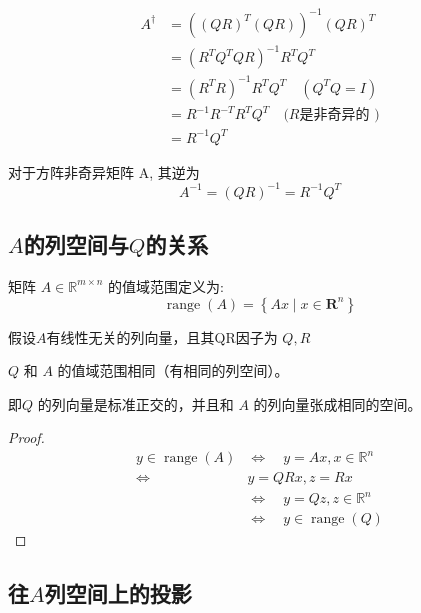 \begin{theorem}
    $$
\begin{aligned}
A^{\dagger}&=\left((Q R)^{T}(Q R)\right)^{-1}(Q R)^{T} \\
&=\left(R^{T} Q^{T} Q R\right)^{-1} R^{T} Q^{T} \\
&=\left(R^{T} R\right)^{-1} R^{T} Q^{T} \quad\left(Q^{T} Q=I\right) \\
&=R^{-1} R^{-T} R^{T} Q^{T} \quad(R{\text {是非奇异的 })} \\
 &={R^{-1} Q^{T}}
\end{aligned}
$$
\end{theorem}

\begin{corollary}
    对于方阵非奇异矩阵 $\mathrm{A}$, 其逆为
$$
A^{-1}=(Q R)^{-1}=R^{-1} Q^{T}
$$
\end{corollary}

\subsection{$A$的列空间与$Q$的关系}

矩阵 $A \in \mathbb{R}^{m \times n}$ 的值域范围定义为:
$$
\operatorname{range}(A)=\left\{A x \mid x \in \mathbf{R}^{n}\right\}
$$

\begin{theorem}
    假设$A$有线性无关的列向量，且其QR因子为 $Q, R$

    $Q$ 和 $A$ 的值域范围相同（有相同的列空间）。

\end{theorem}

即$Q$ 的列向量是标准正交的，并且和 $A$ 的列向量张成相同的空间。

\begin{proof}
    $$
\begin{aligned}
y \in \operatorname{range}(A) & \Leftrightarrow \quad y=A x, x \in \mathbb{R}^{n} \\
\Leftrightarrow & y=Q R x, z=R x \\
& \Leftrightarrow \quad y=Q z, z \in \mathbb{R}^{n} \\
& \Leftrightarrow \quad y \in \operatorname{range}(Q)
\end{aligned}
$$
\end{proof}

\subsection{往$A$列空间上的投影}


